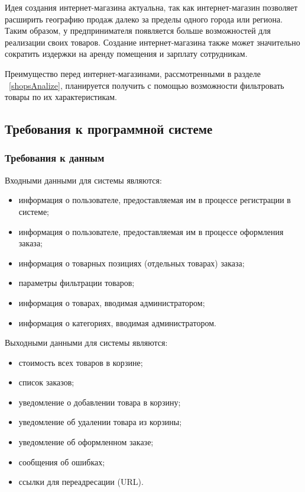 Идея создания интернет-магазина актуальна, так как интернет-магазин позволяет расширить географию продаж далеко за пределы одного города или региона. Таким образом, у предпринимателя появляется больше возможностей для реализации своих товаров. Создание интернет-магазина также может значительно сократить издержки на аренду помещения и зарплату сотрудникам.

Преимущество перед интернет-магазинами, рассмотренными в разделе ~\ref{shopsAnalize}, планируется получить с помощью возможности фильтровать товары по их характеристикам. 

\subsection{Требования к программной системе}

\subsubsection{Требования к данным}
Входными данными для системы являются:
\begin{itemize}
	\item информация о пользователе, предоставляемая им в процессе регистрации в системе;
	\item информация о пользователе, предоставляемая им в процессе оформления заказа;
	\item информация о товарных позициях (отдельных товарах) заказа;
	\item параметры фильтрации товаров;
	\item информация о товарах, вводимая администратором;
	\item информация о категориях, вводимая администратором.
\end{itemize}

Выходными данными для системы являются:
\begin{itemize}
	\item стоимость всех товаров в корзине;
	\item список заказов;
	\item уведомление о добавлении товара в корзину;
	\item уведомление об удалении товара из корзины;
	\item уведомление об оформленном заказе;
	\item сообщения об ошибках;
	\item ссылки для переадресации (URL).
\end{itemize}


